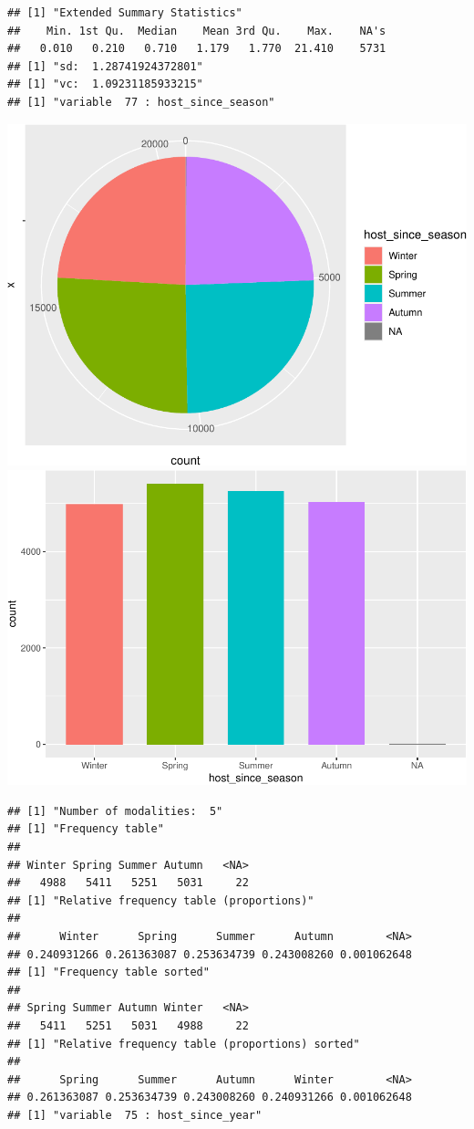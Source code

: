 \begin{verbatim}
## [1] "Extended Summary Statistics"
##    Min. 1st Qu.  Median    Mean 3rd Qu.    Max.    NA's 
##   0.010   0.210   0.710   1.179   1.770  21.410    5731 
## [1] "sd:  1.28741924372801"
## [1] "vc:  1.09231185933215"
## [1] "variable  77 : host_since_season"
\end{verbatim}

\includegraphics{anal_files/figure-latex/unnamed-chunk-9-56.pdf}
\includegraphics{anal_files/figure-latex/unnamed-chunk-9-57.pdf}

\begin{verbatim}
## [1] "Number of modalities:  5"
## [1] "Frequency table"
## 
## Winter Spring Summer Autumn   <NA> 
##   4988   5411   5251   5031     22 
## [1] "Relative frequency table (proportions)"
## 
##      Winter      Spring      Summer      Autumn        <NA> 
## 0.240931266 0.261363087 0.253634739 0.243008260 0.001062648 
## [1] "Frequency table sorted"
## 
## Spring Summer Autumn Winter   <NA> 
##   5411   5251   5031   4988     22 
## [1] "Relative frequency table (proportions) sorted"
## 
##      Spring      Summer      Autumn      Winter        <NA> 
## 0.261363087 0.253634739 0.243008260 0.240931266 0.001062648 
## [1] "variable  75 : host_since_year"
\end{verbatim}

